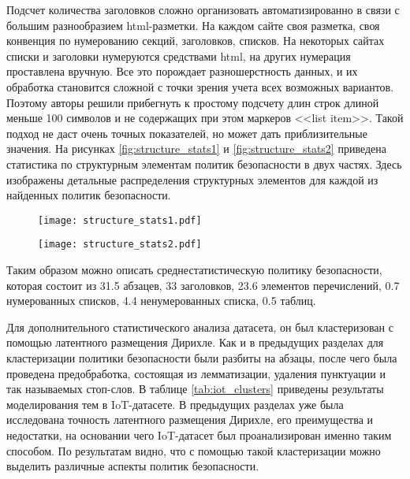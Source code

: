 \documentclass[../main]{subfiles}
\begin{document}
Подсчет количества заголовков сложно организовать автоматизированно в связи с большим разнообразием html-разметки. На каждом сайте своя разметка, своя конвенция по нумерованию секций, заголовков, списков. На некоторых сайтах списки и заголовки нумеруются средствами html, на других нумерация проставлена вручную. Все это порождает разношерстность данных, и их обработка становится сложной с точки зрения учета всех возможных вариантов. Поэтому авторы решили прибегнуть к простому подсчету длин строк длиной меньше 100 символов и не содержащих при этом маркеров <<{list item}>>. Такой подход не даст очень точных показателей, но может дать приблизительные значения. На рисунках \ref{fig:structure_stats1} и \ref{fig:structure_stats2} приведена статистика по структурным элементам политик безопасности в двух частях. Здесь изображены детальные распределения структурных элементов для каждой из найденных политик безопасности.

\begin{figure}[H]
    \centering
    {\texttt{[image: structure\_stats1.pdf]}}
    \vspace{-\baselineskip}
\end{figure}

\begin{figure}[H]
    \centering
    {\texttt{[image: structure\_stats2.pdf]}}
    \vspace{-\baselineskip}
\end{figure}

Таким образом можно описать среднестатистическую политику безопасности, которая состоит из 31.5 абзацев, 33 заголовков, 23.6 элементов перечислений, 0.7 нумерованных списков, 4.4 ненумерованных списка, 0.5 таблиц.

Для дополнительного статистического анализа датасета, он был кластеризован с помощью латентного размещения Дирихле. Как и в предыдущих разделах для кластеризации политики безопасности были разбиты на абзацы, после чего была проведена предобработка, состоящая из лемматизации, удаления пунктуации и так называемых стоп-слов. В таблице \ref{tab:iot_clusters} приведены результаты моделирования тем в IoT-датасете. В предыдущих разделах уже была исследована точность латентного размещения Дирихле, его преимущества и недостатки, на основании чего IoT-датасет был проанализирован именно таким способом. По результатам видно, что с помощью такой кластеризации можно выделить различные аспекты политик безопасности.
\end{document}
